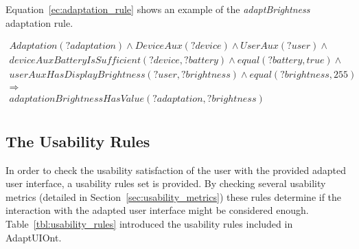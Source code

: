 Equation~\ref{ec:adaptation_rule} shows an example of the \textit{adaptBrightness} 
adaptation rule.

\footnotesize
\begin{equation} \label{ec:adaptation_rule}
  \begin{align*} 
  Adaptation(?adaptation) ∧ DeviceAux(?device) ∧ UserAux(?user) ∧ \\
  deviceAuxBatteryIsSufficient(?device, ?battery) ∧ equal(?battery, true) ∧ \\
  userAuxHasDisplayBrightness(?user, ?brightness) ∧ equal(?brightness, 255)\\ 
  \Rightarrow \\
  adaptationBrightnessHasValue(?adaptation, ?brightness)\\
  \end{align*}
\end{equation}
\normalsize


\subsection{The Usability Rules}
In order to check the usability satisfaction of the user with the provided
adapted user interface, a usability rules set is provided. By checking several
usability metrics (detailed in Section~\ref{sec:usability_metrics}) these rules
determine if the interaction with the adapted user interface might be considered
enough. Table~\ref{tbl:usability_rules} introduced the usability rules included
in AdaptUIOnt.

